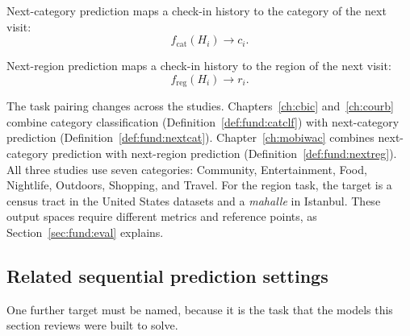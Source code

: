 \begin{definition}\label{def:fund:nextcat}
Next-category prediction maps a check-in history to the category of the next visit:
\begin{equation}
    f_{\mathrm{cat}}(H_i)\longrightarrow c_i.
\end{equation}
\end{definition}

\begin{definition}\label{def:fund:nextreg}
Next-region prediction maps a check-in history to the region of the next visit:
\begin{equation}
    f_{\mathrm{reg}}(H_i)\longrightarrow r_i.
\end{equation}
\end{definition}

The task pairing changes across the studies. Chapters~\ref{ch:cbic}
and~\ref{ch:courb} combine category classification
(Definition~\ref{def:fund:catclf}) with next-category prediction
(Definition~\ref{def:fund:nextcat}). Chapter~\ref{ch:mobiwac} combines next-category
prediction with next-region prediction (Definition~\ref{def:fund:nextreg}). All three
studies use seven categories: Community, Entertainment, Food, Nightlife, Outdoors,
Shopping, and Travel. For the region task, the target is a census tract in the United
States datasets and a \emph{mahalle} in Istanbul. These output spaces require different
metrics and reference points, as Section~\ref{sec:fund:eval} explains.

\subsection{Related sequential prediction settings}

One further target must be named, because it is the task that the models this section
reviews were built to solve.

